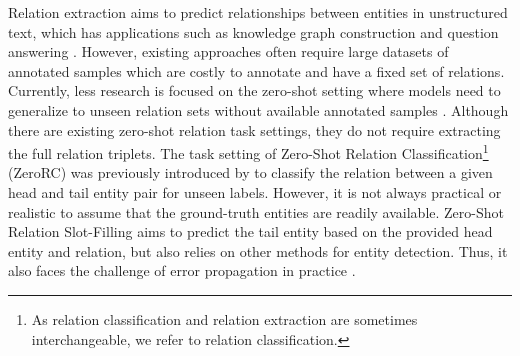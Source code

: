 \documentclass[11pt]{article}
\begin{document}
Relation extraction aims to predict relationships between entities in unstructured text, which has applications such as knowledge graph construction \cite{lin2015learning} and question answering \cite{xu2016question}.
However, existing approaches often require large datasets of annotated samples which are costly to annotate and have a fixed set of relations.
Currently, less research is focused on the zero-shot setting \cite{wang2019survey} where models need to generalize to unseen relation sets without available annotated samples \cite{wang2019survey}.
Although there are existing zero-shot relation task settings, they do not require extracting the full relation triplets.
The task setting of Zero-Shot Relation Classification\footnote{As relation classification and relation extraction are sometimes interchangeable, we refer to relation classification.}
(ZeroRC) was previously introduced by \citet{chen2021zs} to classify the relation between a given head and tail entity pair for unseen labels. 
However, it is not always practical or realistic to assume that the ground-truth entities are readily available.
Zero-Shot Relation Slot-Filling \cite{levy2017zero} aims to predict the tail entity based on the provided head entity and relation, but also relies on other methods for entity detection. 
Thus, it also faces the challenge of error propagation in practice \cite{zhong-chen-2021-frustratingly}.
\end{document}
